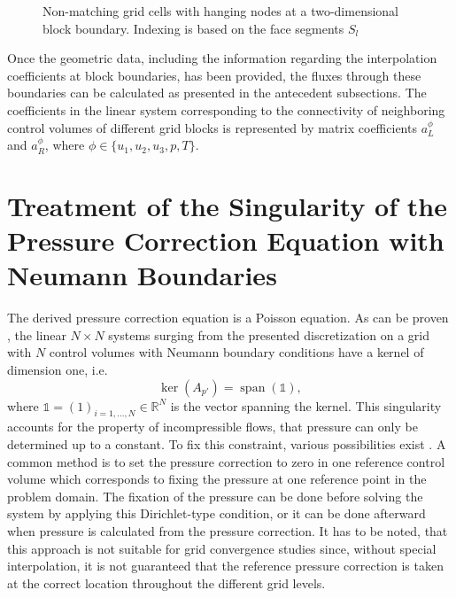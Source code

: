 \begin{figure}
  \centering
  
  \caption{Non-matching grid cells with hanging nodes at a two-dimensional block boundary. Indexing is based on the face segments $S_l$}
  \label{fig:nonmatching}
\end{figure}

Once the geometric data, including the information regarding the interpolation coefficients at block boundaries, has been provided, the fluxes through these boundaries can be calculated as presented in the antecedent subsections. The coefficients in the linear system corresponding to the connectivity of neighboring control volumes of different grid blocks is represented by matrix coefficients \(a_L^{\phi}\) and \(a_R^{\phi}\), where \(\phi \in \{u_1,u_2,u_3,p,T\}\).

\section{Treatment of the Singularity of the Pressure Correction Equation with Neumann Boundaries}
\label{sec:singularitytreatment}

The derived pressure correction equation is a Poisson equation. As can be proven \cite{hackbusch96}, the linear \(N \times N\) systems surging from the presented discretization on a grid with \(N\) control volumes with Neumann boundary conditions have a kernel of dimension one, i.e.
\begin{displaymath}
  \operatorname{ker}(A_{p'}) = \operatorname{span}(\mathbb{1}),
\end{displaymath}
where \(\mathbb{1} = (1)_{i = 1,\dots,N} \in \mathbb{R}^N\) is the vector spanning the kernel. This singularity accounts for the property of incompressible flows, that pressure can only be determined up to a constant. To fix this constraint, various possibilities exist \cite{ferziger02}. A common method is to set the pressure correction to zero in one reference control volume which corresponds to fixing the pressure at one reference point in the problem domain. The fixation of the pressure can be done before solving the system by applying this Dirichlet-type condition, or it can be done afterward when pressure is calculated from the pressure correction. It has to be noted, that this approach is not suitable for grid convergence studies since, without special interpolation, it is not guaranteed that the reference pressure correction is taken at the correct location throughout the different grid levels.

